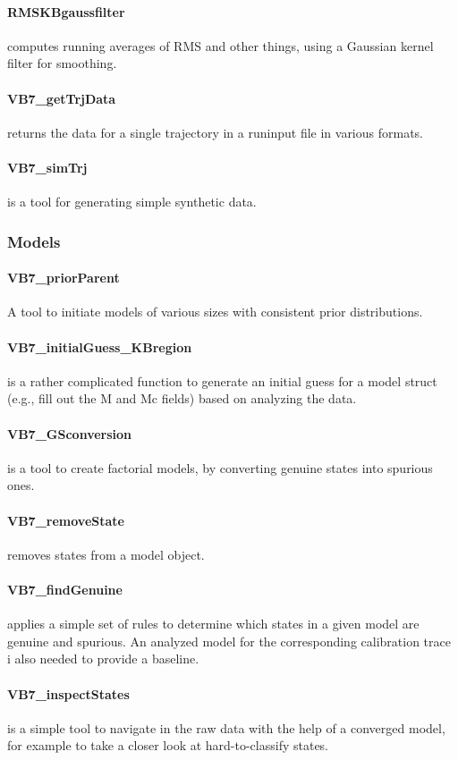 \paragraph{RMSKBgaussfilter}
computes running averages of RMS and other things, using a Gaussian
kernel filter for smoothing.
\paragraph{VB7\_getTrjData} 
returns the data for a single trajectory in a runinput file in various
formats.
\paragraph{VB7\_simTrj} is a tool for generating simple synthetic data.

\subsubsection{Models}
\paragraph{VB7\_priorParent} 
A tool to initiate models of various sizes with consistent prior
distributions.
\paragraph{VB7\_initialGuess\_KBregion} 
is a rather complicated function to generate an initial guess for a
model struct (e.g., fill out the M and Mc fields) based on analyzing
the data.
\paragraph{VB7\_GSconversion}
is a tool to create factorial models, by converting genuine states
into spurious ones.
\paragraph{VB7\_removeState}
removes states from a model object.
\paragraph{VB7\_findGenuine}
applies a simple set of rules to determine which states in a given
model are genuine and spurious. An analyzed model for the
corresponding calibration trace i also needed to provide a baseline.
\paragraph{VB7\_inspectStates} 
is a simple tool to navigate in the raw data with the help of a
converged model, for example to take a closer look at hard-to-classify
states.

